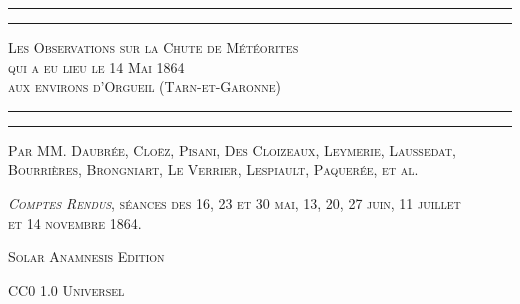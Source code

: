 \documentclass[a4paper, 11pt, oneside, polutonikogreek, french]{article}
\begin{document}
\begin{titlepage} %
	\centering %

	
	\rule{\textwidth}{1.6pt}\vspace*{-\baselineskip}\vspace*{2pt} %
	\rule{\textwidth}{0.4pt} %
	
	\vspace{1\baselineskip} %
	
	{\scshape\Huge Les Observations sur la Chute de Météorites\\ qui a eu lieu le 14 Mai 1864 \\ aux environs d'Orgueil (Tarn-et-Garonne)}
	
	\vspace{1\baselineskip} %

	\rule{\textwidth}{0.4pt}\vspace*{-\baselineskip}\vspace{3.2pt} %
	\rule{\textwidth}{1.6pt} %
	
	\vspace{1\baselineskip} %
	

	{\scshape Par \Large MM. Daubrée, Cloëz, Pisani, Des Cloizeaux, Leymerie, Laussedat, Bourrières, Brongniart, Le Verrier, Lespiault, Paquerée, et al.} %
	    
    \vspace*{\fill}

	\vspace{1\baselineskip}

	{\small\scshape \emph{Comptes Rendus}, séances des 16, 23 et 30 mai, 13, 20, 27 juin, 11 juillet\\ et 14 novembre 1864.}
	
	\vspace{0.5\baselineskip} %

    {\small\scshape Solar Anamnesis Edition} %
	
	{\scshape\small CC0 1.0 Universel} %
\end{titlepage}
\setlength{\parskip}{1mm plus1mm minus1mm}
\clearpage
\tableofcontents
\clearpage
\end{document}
